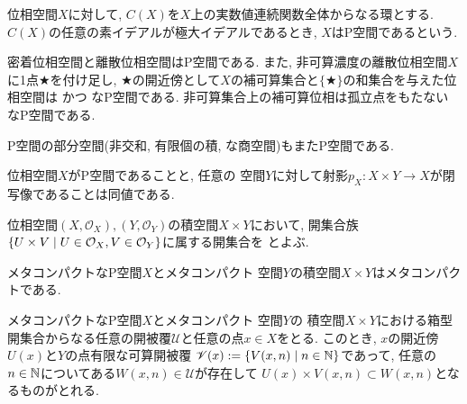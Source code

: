 \documentclass[uplatex, dvipdfmx, a4paper, 12pt, class=jsbook, crop=false]{standalone}
\begin{document}
\begin{proposition}
	位相空間$ X $に対して, $ C(X) $を$ X $上の実数値連続関数全体からなる環とする. 
	$ C(X) $の任意の素イデアルが極大イデアルであるとき, $ X $はP空間であるという.
\end{proposition}

密着位相空間と離散位相空間はP空間である. また, 非可算濃度の離散位相空間$ X $に1点$ \bigstar $を付け足し, 
$ \bigstar $の開近傍として$ X $の補可算集合と$ \{\bigstar\} $の和集合を与えた位相空間は \Hausdorff かつ \Lindelof なP空間である. 
非可算集合上の補可算位相は孤立点をもたない  なP空間である.

\begin{proposition}
	\label{prop: Subspace of a P-space is also a P-space}
	P空間の部分空間(非交和, 有限個の積, な商空間)もまたP空間である.
\end{proposition}

\begin{proposition}
	\label{prop: An equivalent condition that a space is a P-space}
	位相空間$ X $がP空間であることと, 
	任意の \Lindelof 空間$ Y $に対して射影$ p_X \colon X \times Y \to X $が閉写像であることは同値である.
\end{proposition}

\begin{definition}
	位相空間$ (X, \mathcal{O}_X), (Y, \mathcal{O}_Y) $の積空間$ X \times Y $において, 
	開集合族$ \setcomp{U \times V}{U \in \mathcal{O}_X, V \in \mathcal{O}_Y} $に属する開集合を
	とよぶ.
\end{definition}

\begin{proposition}
	\label{prop:A product of a MetaCpt P space and a MetaCpt Lindelof space is MetaCpt}
	メタコンパクトなP空間$ X $とメタコンパクト \Lindelof 空間$ Y $の積空間$ X \times Y $はメタコンパクトである.
\end{proposition}

\begin{lemma}
	\label{lemma:Lemma for the statement on the metacompactness of the product space of a MetaCpt P-space and a ParaCpt Lindelof space}	
	メタコンパクトなP空間$ X $とメタコンパクト \Lindelof 空間$ Y $の
	積空間$ X \times Y $における箱型開集合からなる任意の開被覆$ \mathscr{U} $と任意の点$ x \in X $をとる. 
	このとき, $ x $の開近傍$ U(x) $と$ Y $の点有限な可算開被覆
	$ \mathscr{V}(x) \defeq \setcomp{V(x, n)}{n \in \N} $であって, 
	任意の$ n \in \mathbb{N} $についてある$ W(x, n) \in \mathscr{U} $が存在して
	$ U(x) \times V(x, n) \subset W(x, n) $となるものがとれる.
\end{lemma}
\end{document}
